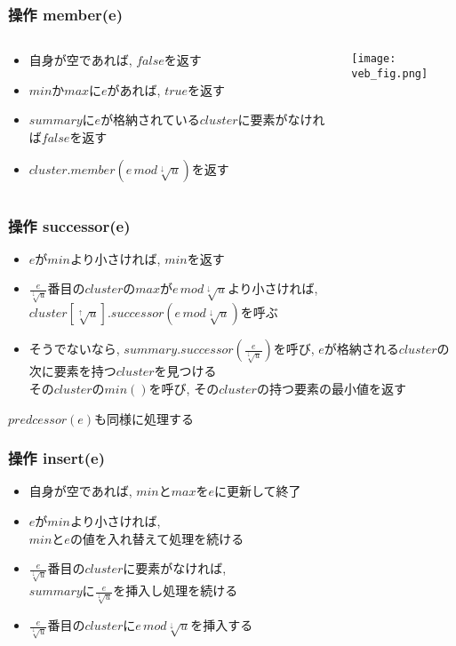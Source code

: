 \documentclass[dvipdfmx,12pt,notheorems]{beamer}
\theoremstyle{definition}
\begin{document}
\begin{frame}\frametitle{操作\; member(e)}
\begin{columns}
\begin{column}{0.4\textwidth}
\begin{itemize}
\item 自身が空であれば, $false$を返す
\item $min$か$max$に$e$があれば, $true$を返す
\item $summary$に$e$が格納されている$cluster$に要素がなければ$false$を返す
\item $cluster.member(e\, mod \sqrt[\downarrow]{u})$を返す
\end{itemize}
\end{column}
\begin{column}{0.59\textwidth}
\texttt{[image: veb\_fig.png]}
\end{column}
\end{columns}
\end{frame}

\begin{frame}\frametitle{操作\; successor(e)}
\begin{itemize}
\item $e$が$min$より小さければ, $min$を返す
\item $\frac{e}{\sqrt[\downarrow]{u}}$番目の$cluster$の$max$が$e\,mod \sqrt[\downarrow]{u}$より小さければ,\\
	$cluster[\sqrt[\uparrow]{u}].successor(e\,mod \sqrt[\downarrow]{u})$を呼ぶ
\item そうでないなら, $summary.successor(\frac{e}{\sqrt[\downarrow]{u}})$を呼び, $e$が格納される$cluster$の次に要素を持つ$cluster$を見つける\\
	その$cluster$の$min()$を呼び, その$cluster$の持つ要素の最小値を返す
\end{itemize}
$predcessor(e)$も同様に処理する
\end{frame}

\begin{frame}\frametitle{操作\; insert(e)}
\begin{itemize}
\item 自身が空であれば, $min$と$max$を$e$に更新して終了
\item $e$が$min$より小さければ, \\ $min$と$e$の値を入れ替えて処理を続ける
\item $\frac{e}{\sqrt[\downarrow]{u}}$番目の$cluster$に要素がなければ, \\ $summary$に$\frac{e}{\sqrt[\downarrow]{u}}$を挿入し処理を続ける
\item $\frac{e}{\sqrt[\downarrow]{u}}$番目の$cluster$に$e\, mod \sqrt[\downarrow]{u}$を挿入する
\end{itemize}
\end{frame}
\end{document}
